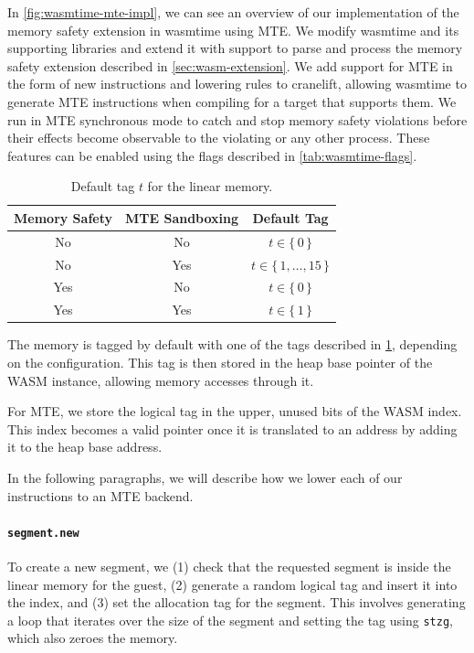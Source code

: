 In \cref{fig:wasmtime-mte-impl}, we can see an overview of our implementation of the memory safety extension in wasmtime using \ac{MTE}.
We modify wasmtime and its supporting libraries and extend it with support to parse and process the memory safety extension described in \cref{sec:wasm-extension}.
We add support for \ac{MTE} in the form of new instructions and lowering rules to cranelift, allowing wasmtime to generate \ac{MTE} instructions when compiling for a target that supports them.
We run in \ac{MTE} synchronous mode to catch and stop memory safety violations before their effects become observable to the violating or any other process.
These features can be enabled using the flags described in \cref{tab:wasmtime-flags}.

\begin{table}
    \centering
    \caption{Default tag $t$ for the linear memory.}
    \label{tab:default-tag}
    \begin{tabular}{c | c || c}
        \textbf{Memory Safety} & \textbf{MTE Sandboxing} & \textbf{Default Tag}         \\
        \hline
        No                     & No                      & $t \in \{\,0\,\}$            \\
        No                     & Yes                     & $t \in \{\,1, \dots, 15\,\}$ \\
        Yes                    & No                      & $t \in \{\,0\,\}$            \\
        Yes                    & Yes                     & $t \in \{\,1\,\}$
    \end{tabular}
\end{table}

The memory is tagged by default with one of the tags described in \cref{tab:default-tag}, depending on the configuration.
This tag is then stored in the heap base pointer of the \ac{WASM} instance, allowing memory accesses through it.

For \ac{MTE}, we store the logical tag in the upper, unused bits of the \ac{WASM} index.
This index becomes a valid pointer once it is translated to an address by adding it to the heap base address.

In the following paragraphs, we will describe how we lower each of our instructions to an \ac{MTE} backend.

\paragraph{\texttt{segment.new}} To create a new segment, we (1) check that the requested segment is inside the linear memory for the guest, (2) generate a random logical tag and insert it into the index, and (3) set the allocation tag for the segment.
This involves generating a loop that iterates over the size of the segment and setting the tag using \texttt{stzg}, which also zeroes the memory.

